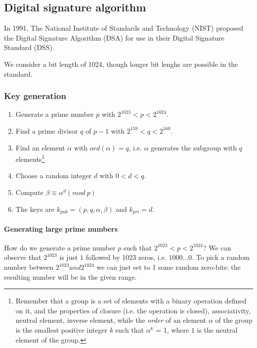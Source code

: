 \documentclass{article}
\begin{document}
	\subsection{Digital signature algorithm}

	In 1991, The National Institute of Standards and Technology (NIST) proposed
	the Digital Signature Algorithm (DSA) for use in their Digital Signature
	Standard (DSS).


	We consider a bit length of 1024, though longer bit lenghs are possible in
	the standard.

	\subsubsection{Key generation}

	\begin{enumerate}
		\item Generate a prime number $p$ with $2^{1023} < p < 2^{1024}$.
		\item Find a prime divisor $q$ of $p-1$ with $2^{159} < q < 2^{160}$.
		\item Find an element $\alpha$ with $ord(\alpha) = q$, i.e. $\alpha$
			generates the subgroup with $q$ elements\footnote{Remember that a
			group is a set of elements with a binary operation defined on it,
			and the properties of closure (i.e. the operation is closed), 
			associativity, neutral element, inverse element, while the \emph{order} 
			of an element $\alpha$ of the group is the smallest positive integer $k$
			such that $\alpha^{k}$ = 1, where $1$ is the neutral element of the
			group.}
		\item Choose a random integer $d$ with $0 < d < q$.
		\item Compute $\beta \equiv \alpha^{d} ( mod ~ p )$
		\item The keys are $k_{pub} = (p, q, \alpha , \beta)$ and $k_{pri}= d$.
	\end{enumerate}

	\paragraph{Generating large prime numbers}

	How do we generate a prime number $p$ such that $2^{1023} < p < 2^{1024}$?
	We can observe that $2^{1023}$ is just $1$ followed by 1023 zeros, i.e.
	$1000...0$. To pick a random number between $2^{1023} and 2^{1024}$ we can
	just set to 1 some random zero-bits: the resulting number will be in the
	given range.
\end{document}
